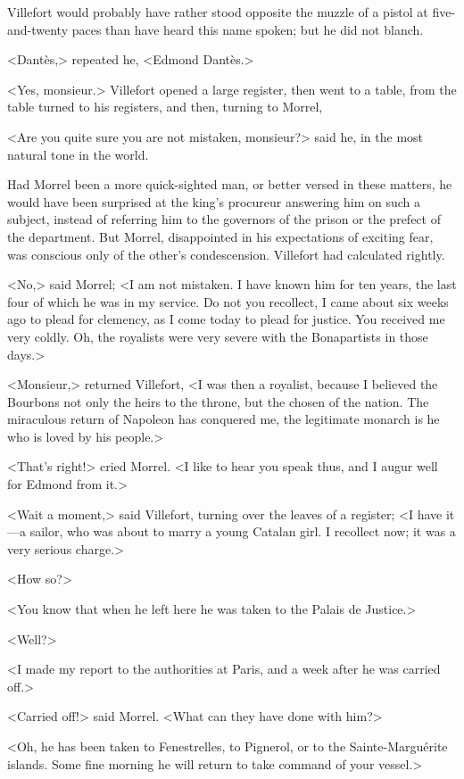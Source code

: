  Villefort would probably have rather stood opposite the muzzle of a pistol at five-and-twenty paces than have heard this name spoken; but he did not blanch. 

 <Dantès,> repeated he, <Edmond Dantès.> 

 <Yes, monsieur.> Villefort opened a large register, then went to a table, from the table turned to his registers, and then, turning to Morrel, 

 <Are you quite sure you are not mistaken, monsieur?> said he, in the most natural tone in the world. 

 Had Morrel been a more quick-sighted man, or better versed in these matters, he would have been surprised at the king's procureur answering him on such a subject, instead of referring him to the governors of the prison or the prefect of the department. But Morrel, disappointed in his expectations of exciting fear, was conscious only of the other's condescension. Villefort had calculated rightly. 

 <No,> said Morrel; <I am not mistaken. I have known him for ten years, the last four of which he was in my service. Do not you recollect, I came about six weeks ago to plead for clemency, as I come today to plead for justice. You received me very coldly. Oh, the royalists were very severe with the Bonapartists in those days.> 

 <Monsieur,> returned Villefort, <I was then a royalist, because I believed the Bourbons not only the heirs to the throne, but the chosen of the nation. The miraculous return of Napoleon has conquered me, the legitimate monarch is he who is loved by his people.> 

 <That's right!> cried Morrel. <I like to hear you speak thus, and I augur well for Edmond from it.> 

 <Wait a moment,> said Villefort, turning over the leaves of a register; <I have it—a sailor, who was about to marry a young Catalan girl. I recollect now; it was a very serious charge.> 

 <How so?> 

 <You know that when he left here he was taken to the Palais de Justice.> 

 <Well?> 

 <I made my report to the authorities at Paris, and a week after he was carried off.> 

 <Carried off!> said Morrel. <What can they have done with him?> 

 <Oh, he has been taken to Fenestrelles, to Pignerol, or to the Sainte-Marguérite islands. Some fine morning he will return to take command of your vessel.> 

